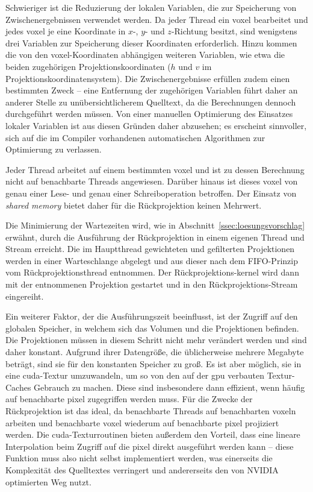 Schwieriger ist die Reduzierung der lokalen Variablen, die zur Speicherung von Zwischenergebnissen verwendet werden. Da
jeder Thread ein \gls{voxel} bearbeitet und jedes \gls{voxel} je eine Koordinate in $x$-, $y$- und $z$-Richtung besitzt,
sind wenigstens drei Variablen zur Speicherung dieser Koordinaten erforderlich. Hinzu kommen die von den
\gls{voxel}-Koordinaten abhängigen weiteren Variablen, wie etwa die beiden zugehörigen Projektionskoordinaten ($h$ und
$v$ im Projektionskoordinatensystem). Die Zwischenergebnisse erfüllen zudem einen bestimmten Zweck -- eine Entfernung
der zugehörigen Variablen führt daher an anderer Stelle zu unübersichtlicherem Quelltext, da die Berechnungen dennoch
durchgeführt werden müssen. Von einer manuellen Optimierung des Einsatzes lokaler Variablen ist aus diesen Gründen daher
abzusehen; es erscheint sinnvoller, sich auf die im Compiler vorhandenen automatischen Algorithmen zur Optimierung zu
verlassen.

Jeder Thread arbeitet auf einem bestimmten \gls{voxel} und ist zu dessen Berechnung nicht auf benachbarte Threads
angewiesen. Darüber hinaus ist dieses \gls{voxel} von genau einer Lese- und genau einer Schreiboperation betroffen. Der
Einsatz von \textit{shared memory} bietet daher für die Rückprojektion keinen Mehrwert.

Die Minimierung der Wartezeiten wird, wie in Abschnitt~\ref{ssec:loesungsvorschlag} erwähnt, durch die Ausführung der
Rückprojektion in einem eigenen Thread und Stream erreicht. Die im Hauptthread gewichteten und gefilterten Projektionen
werden in einer Warteschlange abgelegt und aus dieser nach dem FIFO-Prinzip vom Rückprojektionsthread entnommen. Der
Rückprojektions-\gls{kernel} wird dann mit der entnommenen Projektion gestartet und in den Rückprojektions-Stream
eingereiht.

Ein weiterer Faktor, der die Ausführungszeit beeinflusst, ist der Zugriff auf den globalen Speicher, in welchem sich
das Volumen und die Projektionen befinden. Die Projektionen müssen in diesem Schritt nicht mehr verändert werden und
sind daher konstant. Aufgrund ihrer Datengröße, die üblicherweise mehrere Megabyte beträgt, sind sie für den konstanten
Speicher zu groß. Es ist aber möglich, sie in eine \gls{cuda}-Textur umzuwandeln, um so von den auf der \gls{gpu}
verbauten Textur-Caches Gebrauch zu machen. Diese sind insbesondere dann effizient, wenn häufig auf benachbarte
\gls{pixel} zugegriffen werden muss. Für die Zwecke der Rückprojektion ist das ideal, da benachbarte Threads auf
benachbarten \gls{voxel}n arbeiten und benachbarte \gls{voxel} wiederum auf benachbarte \gls{pixel} projiziert werden.
Die \gls{cuda}-Texturroutinen bieten außerdem den Vorteil, dass eine lineare Interpolation beim Zugriff auf die
\gls{pixel} direkt ausgeführt werden kann -- diese Funktion muss also nicht selbst implementiert werden, was einerseits
die Komplexität des Quelltextes verringert und andererseits den von NVIDIA optimierten Weg nutzt.

